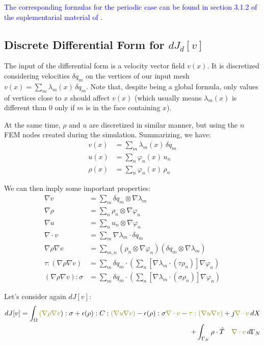 \documentclass[11pt]{article}
\newcommand{\blue}{\textcolor{blue}}
\newcommand{\olive}{\textcolor{olive}}
\begin{document}
\blue{The corresponding formulas for the periodic case can be found in section 3.1.2 of the suplementarial material of \cite{panetta2017}.}

\subsection{Discrete Differential Form for $dJ_d[v]$}

The input of the differential form is a velocity vector field $v(x)$. It is discretized considering velocities $\delta q_m$ on the vertices of our input mesh $v(x) = \sum_m \lambda_m(x) \, \delta q_m$. Note that, despite being a global formula, only values of vertices close to $x$ should affect $v(x)$ (which usually means $\lambda_m(x)$ is different than $0$ only if $m$ is in the face containing $x$).

At the same time, $\rho$ and $u$ are discretized in similar manner, but using the $n$ FEM nodes created during the simulation. Summarizing, we have:
\begin{align*}
    v(x) &= \sum_m \lambda_m(x) \, \delta q_m\\
    u(x) &= \sum_n \varphi_n(x) \, u_n\\
    \rho(x) &= \sum_n \varphi_n(x) \, \rho_n
\end{align*}

We can then imply some important properties:
\begin{align*}
    \nabla v &= \sum_m   \delta q_m \otimes \nabla \lambda_m\\
    \nabla \rho &= \sum_n   \rho_n \otimes \nabla \varphi_n\\
    \nabla u &= \sum_n   u_n \otimes \nabla \varphi_n\\
    \nabla \cdot v &= \sum_m   \nabla \lambda_m \cdot \delta q_m\\    
    \nabla \rho \nabla v &= \sum_{m,n} (\rho_n \otimes \nabla \varphi_n)(\delta q_m \otimes \nabla \lambda_m)\\
    \tau:(\nabla \rho \nabla v) &= \sum_m \delta q_m \cdot (\sum_n \left[ \nabla \lambda_m \cdot (\tau \rho_n) \right] \nabla \varphi_n)\\
    (\nabla \rho \nabla v):\sigma &= \sum_m \delta q_m \cdot (\sum_n \left[ \nabla \lambda_m \cdot (\sigma \rho_n) \right] \nabla \varphi_n)
\end{align*}

Let's consider again $dJ[v]$:
\begin{align*}
  dJ[v] = \int_{\Omega} \olive{(\nabla \rho \nabla v}):\sigma + \epsilon(\rho):C:\olive{(\nabla u \nabla v)} - \epsilon(\rho): \sigma \olive{\nabla \cdot v}  - \olive{\tau : (\nabla u \nabla v)} + j \olive{\nabla \cdot v} \, dX \\ + \int_{\Gamma_{N}} \rho \cdot \hat T \quad \olive{\nabla \cdot v}\, d\Gamma_{N}
\end{align*}
\end{document}
